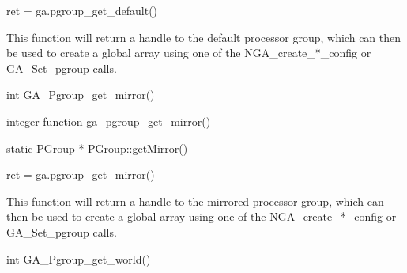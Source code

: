 \documentclass[12pt]{article}
\begin{document}
\begin{pyapi}
\begin{pycode}
ret = ga.pgroup_get_default()
\end{pycode}
\end{pyapi}

\local

\begin{desc}
This function will return a handle to the default processor group, which can
then be used to create a global array using one of the NGA_create_*_config or
GA_Set_pgroup calls.
\end{desc}


\begin{capi}
\begin{ccode}
int GA_Pgroup_get_mirror()
\end{ccode}
\end{capi}

\begin{fapi}
\begin{fcode}
integer function ga_pgroup_get_mirror()
\end{fcode}
\end{fapi}

\begin{cxxapi}
\begin{cxxcode}
static PGroup * PGroup::getMirror()
\end{cxxcode}
\end{cxxapi}

\begin{pyapi}
\begin{pycode}
ret = ga.pgroup_get_mirror()
\end{pycode}
\end{pyapi}

\local

\begin{desc}
This function will return a handle to the mirrored processor group, which can
then be used to create a global array using one of the NGA_create_*_config or
GA_Set_pgroup calls.
\end{desc}


\begin{capi}
\begin{ccode}
int GA_Pgroup_get_world()
\end{ccode}
\end{capi}
\end{document}
